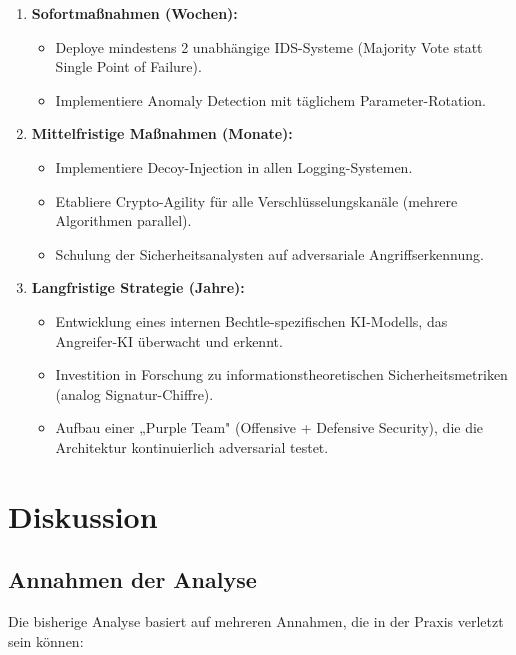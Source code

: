\documentclass[a4paper,12pt]{article}
\theoremstyle{definition}
\begin{document}
\begin{enumerate}
	\item \textbf{Sofortmaßnahmen (Wochen):}
	\begin{itemize}
		\item Deploye mindestens 2 unabhängige IDS-Systeme (Majority Vote statt Single Point of Failure).
		\item Implementiere Anomaly Detection mit täglichem Parameter-Rotation.
	\end{itemize}
	
	\item \textbf{Mittelfristige Maßnahmen (Monate):}
	\begin{itemize}
		\item Implementiere Decoy-Injection in allen Logging-Systemen.
		\item Etabliere Crypto-Agility für alle Verschlüsselungskanäle (mehrere Algorithmen parallel).
		\item Schulung der Sicherheitsanalysten auf adversariale Angriffserkennung.
	\end{itemize}
	
	\item \textbf{Langfristige Strategie (Jahre):}
	\begin{itemize}
		\item Entwicklung eines internen Bechtle-spezifischen KI-Modells, das Angreifer-KI überwacht und erkennt.
		\item Investition in Forschung zu informationstheoretischen Sicherheitsmetriken (analog Signatur-Chiffre).
		\item Aufbau einer „Purple Team" (Offensive + Defensive Security), die die Architektur kontinuierlich adversarial testet.
	\end{itemize}
\end{enumerate}

\section{Diskussion}

\subsection{Annahmen der Analyse}

Die bisherige Analyse basiert auf mehreren Annahmen, die in der Praxis verletzt sein können:
\end{document}
